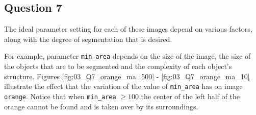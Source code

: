 \subsection{Question 7}

The ideal parameter setting for each of these images depend on various
factors, along with the degree of segmentation that is desired.

For example, parameter \texttt{min\_area} depends on the size of the
image, the size of the objects that are to be segmented and the complexity
of each object's structure. Figures \ref{fig:03_Q7_orange_ma_500} -
\ref{fig:03_Q7_orange_ma_10} illustrate the effect that the variation of the
value of \texttt{min\_area} has on image \texttt{orange}. Notice that
when \texttt{min\_area} $\geq 100$ the center of the left half of the orange
cannot be found and is taken over by its surroundings.

\noindent{}

